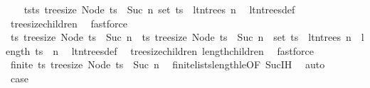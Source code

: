 \begin{isabellebody}
\ \ \isamarkupfalse%
\ {\isachardoublequoteopen}{\isasymforall}ts{\isasymin}{\isacharbraceleft}{\kern0pt}ts{\isachardot}{\kern0pt}\ tree{\isacharunderscore}{\kern0pt}size\ {\isacharparenleft}{\kern0pt}Node\ ts{\isacharparenright}{\kern0pt}\ {\isasymle}\ Suc\ n{\isacharbraceright}{\kern0pt}{\isachardot}{\kern0pt}\ set\ ts\ {\isasymsubseteq}\ lt{\isacharunderscore}{\kern0pt}n{\isacharunderscore}{\kern0pt}trees\ n{\isachardoublequoteclose}\ \isamarkupfalse%
\ lt{\isacharunderscore}{\kern0pt}n{\isacharunderscore}{\kern0pt}trees{\isacharunderscore}{\kern0pt}def\ \isamarkupfalse%
\ tree{\isacharunderscore}{\kern0pt}size{\isacharunderscore}{\kern0pt}children\ \isamarkupfalse%
\ fastforce\isanewline
\isanewline
\ \ \isamarkupfalse%
\ {\isachardoublequoteopen}{\isacharbraceleft}{\kern0pt}ts{\isachardot}{\kern0pt}\ tree{\isacharunderscore}{\kern0pt}size\ {\isacharparenleft}{\kern0pt}Node\ ts{\isacharparenright}{\kern0pt}\ {\isasymle}\ Suc\ n{\isacharbraceright}{\kern0pt}\ {\isacharequal}{\kern0pt}\ {\isacharbraceleft}{\kern0pt}ts{\isachardot}{\kern0pt}\ tree{\isacharunderscore}{\kern0pt}size\ {\isacharparenleft}{\kern0pt}Node\ ts{\isacharparenright}{\kern0pt}\ {\isasymle}\ Suc\ n\ {\isasymand}\ set\ ts\ {\isasymsubseteq}\ lt{\isacharunderscore}{\kern0pt}n{\isacharunderscore}{\kern0pt}trees\ n\ {\isasymand}\ length\ ts\ {\isasymle}\ n{\isacharbraceright}{\kern0pt}{\isachardoublequoteclose}\ \isamarkupfalse%
\ lt{\isacharunderscore}{\kern0pt}n{\isacharunderscore}{\kern0pt}trees{\isacharunderscore}{\kern0pt}def\ \isamarkupfalse%
\ tree{\isacharunderscore}{\kern0pt}size{\isacharunderscore}{\kern0pt}children\ length{\isacharunderscore}{\kern0pt}children\ \isamarkupfalse%
\ fastforce\isanewline
\ \ \isamarkupfalse%
\ \isamarkupfalse%
\ {\isachardoublequoteopen}finite\ {\isacharbraceleft}{\kern0pt}ts{\isachardot}{\kern0pt}\ tree{\isacharunderscore}{\kern0pt}size\ {\isacharparenleft}{\kern0pt}Node\ ts{\isacharparenright}{\kern0pt}\ {\isasymle}\ Suc\ n{\isacharbraceright}{\kern0pt}{\isachardoublequoteclose}\ \isamarkupfalse%
\ finite{\isacharunderscore}{\kern0pt}lists{\isacharunderscore}{\kern0pt}length{\isacharunderscore}{\kern0pt}le{\isacharbrackleft}{\kern0pt}OF\ Suc{\isachardot}{\kern0pt}IH{\isacharbrackright}{\kern0pt}\ \isamarkupfalse%
\ auto\isanewline
\ \ \isamarkupfalse%
\ \isamarkupfalse%
\ {\isacharquery}{\kern0pt}case\ \isamarkupfalse%

\end{isabellebody}
